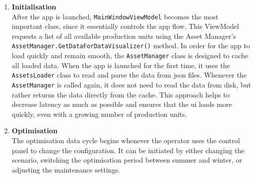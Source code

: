 \begin{enumerate}
    \sloppy
    \item \textbf{Initialisation}\\
    After the app is launched, \texttt{MainWindow}\allowbreak\texttt{ViewModel} becomes the most important class, since it essentially controls the app flow. This ViewModel requests a list of all available production units using the Asset Manager's \texttt{AssetManager.}\allowbreak\texttt{GetDataForDataVisualizer()} method. In order for the app to load quickly and remain smooth, the \texttt{AssetManager} class is designed to cache all loaded data. When the app is launched for the first time, it uses the \texttt{AssetsLoader} class to read and parse the data from \acrshort{json} files. Whenever the \texttt{AssetManager} is called again, it does not need to read the data from disk, but rather returns the data directly from the cache. This approach helps to decrease latency as much as possible and ensures that the \acrshort{ui} loads more quickly, even with a growing number of production units.

    \item \textbf{Optimisation}\\
    The optimisation data cycle begins whenever the operator uses the control panel to change the configuration. It can be initiated by either changing the scenario, switching the optimisation period between summer and winter, or adjusting the maintenance settings.


\end{enumerate}

